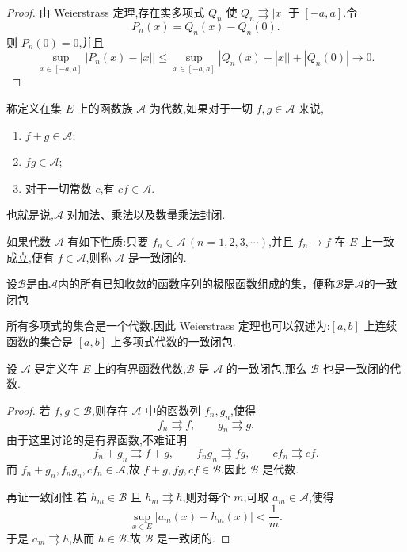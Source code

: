 \begin{proof}
	由 Weierstrass 定理,存在实多项式 $Q_n$ 使 $Q_n\rightrightarrows |x|$ 于 $[-a,a]$.令
	\[
	P_n(x)=Q_n(x)-Q_n(0).
	\]
	则 $P_n(0)=0$,并且
	\[
	\sup_{x\in[-a,a]}|P_n(x)-|x||
	\leqslant \sup_{x\in[-a,a]}|Q_n(x)-|x||+|Q_n(0)|\to0.
	\]
\end{proof}

\begin{definition}
	称定义在集 $E$ 上的函数族 $\mathscr{A}$ 为代数,如果对于一切 $f,g\in\mathscr{A}$ 来说,
	\begin{enumerate}
		\item $f+g\in\mathscr{A}$;
		\item $fg\in\mathscr{A}$;
		\item 对于一切常数 $c$,有 $cf\in\mathscr{A}$.
	\end{enumerate}
	也就是说,$\mathscr{A}$ 对加法、乘法以及数量乘法封闭.
	
	如果代数 $\mathscr{A}$ 有如下性质:只要 $f_n\in\mathscr{A}\,(n=1,2,3,\cdots)$,并且 $f_n\to f$ 在 $E$ 上一致成立,便有 $f\in\mathscr{A}$,则称 $\mathscr{A}$ 是一致闭的.
	
	设$\mathscr{B}$是由$\mathscr{A}$内的所有已知收敛的函数序列的极限函数组成的集，便称$\mathscr{B}$是$\mathscr{A}$的一致闭包
\end{definition}

所有多项式的集合是一个代数.因此 Weierstrass 定理也可以叙述为:$[a,b]$ 上连续函数的集合是 $[a,b]$ 上多项式代数的一致闭包.

\begin{proposition}
	设 $\mathscr{A}$ 是定义在 $E$ 上的有界函数代数,$\mathscr{B}$ 是 $\mathscr{A}$ 的一致闭包,那么 $\mathscr{B}$ 也是一致闭的代数.
\end{proposition}

\begin{proof}
	若 $f,g\in\mathscr{B}$,则存在 $\mathscr{A}$ 中的函数列 $f_n,g_n$,使得
	\[
	f_n\rightrightarrows f,
	\qquad
	g_n\rightrightarrows g.
	\]
	由于这里讨论的是有界函数,不难证明
	\[
	f_n+g_n\rightrightarrows f+g,
	\qquad
	f_ng_n\rightrightarrows fg,
	\qquad
	cf_n\rightrightarrows cf.
	\]
	而 $f_n+g_n,f_ng_n,cf_n\in\mathscr{A}$,故 $f+g,fg,cf\in\mathscr{B}$.因此 $\mathscr{B}$ 是代数.
	
	再证一致闭性.若 $h_m\in\mathscr{B}$ 且 $h_m\rightrightarrows h$,则对每个 $m$,可取 $a_m\in\mathscr{A}$,使得
	\[
	\sup_{x\in E}|a_m(x)-h_m(x)|<\frac1m.
	\]
	于是 $a_m\rightrightarrows h$,从而 $h\in\mathscr{B}$.故 $\mathscr{B}$ 是一致闭的.
\end{proof}

